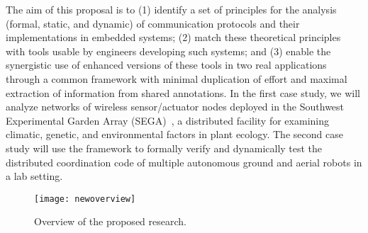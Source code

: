The aim of this proposal is to (1) identify a set of principles for the analysis (formal, static,
  and dynamic) of communication protocols and
  their implementations in embedded systems; (2) match these theoretical principles with tools usable by
  engineers developing such systems; and (3) enable the synergistic
  use of enhanced versions of these tools in two real applications
  through a common framework with minimal duplication of effort and
  maximal extraction of information from shared annotations.
  In the first case study, we will analyze networks
  of wireless sensor/actuator nodes deployed in the Southwest Experimental Garden
  Array (SEGA)~\cite{YamEtAl10,FliEtAl12}, a distributed facility for
  examining climatic, genetic, and environmental factors in plant ecology.
  The second case study will use the framework to formally verify and dynamically test the distributed coordination code of multiple autonomous ground and aerial robots in a lab setting.


\begin{figure}[!t]
  \centering
  \texttt{[image: newoverview]}
  \caption{Overview of the proposed research.}
  \label{fig:overview}
\end{figure}

